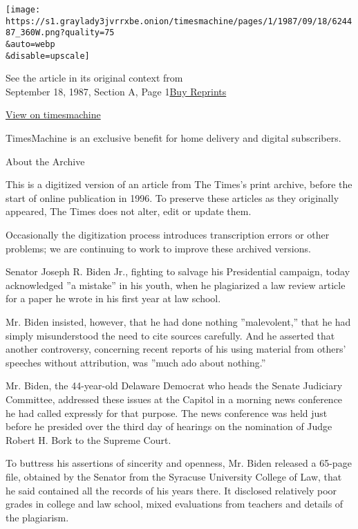 \texttt{[image: https://s1.graylady3jvrrxbe.onion/timesmachine/pages/1/1987/09/18/624487\_360W.png?quality=75\\\&auto=webp\\\&disable=upscale]}

See the article in its original context from\\
September 18, 1987, Section A, Page
1\href{https://store.nytimes3xbfgragh.onion/collections/new-york-times-page-reprints?utm_source=nytimes\&utm_medium=article-page\&utm_campaign=reprints}{Buy
Reprints}

\href{http://timesmachine.nytimes3xbfgragh.onion/timesmachine/1987/09/18/624487.html}{View
on timesmachine}

TimesMachine is an exclusive benefit for home delivery and digital
subscribers.

About the Archive

This is a digitized version of an article from The Times's print
archive, before the start of online publication in 1996. To preserve
these articles as they originally appeared, The Times does not alter,
edit or update them.

Occasionally the digitization process introduces transcription errors or
other problems; we are continuing to work to improve these archived
versions.

Senator Joseph R. Biden Jr., fighting to salvage his Presidential
campaign, today acknowledged ''a mistake'' in his youth, when he
plagiarized a law review article for a paper he wrote in his first year
at law school.

Mr. Biden insisted, however, that he had done nothing ''malevolent,''
that he had simply misunderstood the need to cite sources carefully. And
he asserted that another controversy, concerning recent reports of his
using material from others' speeches without attribution, was ''much ado
about nothing.''

Mr. Biden, the 44-year-old Delaware Democrat who heads the Senate
Judiciary Committee, addressed these issues at the Capitol in a morning
news conference he had called expressly for that purpose. The news
conference was held just before he presided over the third day of
hearings on the nomination of Judge Robert H. Bork to the Supreme Court.

To buttress his assertions of sincerity and openness, Mr. Biden released
a 65-page file, obtained by the Senator from the Syracuse University
College of Law, that he said contained all the records of his years
there. It disclosed relatively poor grades in college and law school,
mixed evaluations from teachers and details of the plagiarism.

